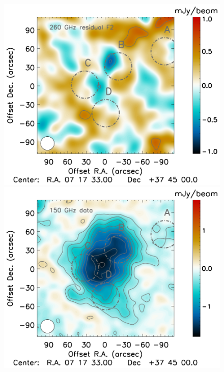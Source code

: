 \documentclass[twocolumn,traditabstract]{aa}
\begin{document}
\begin{figure}[h]
\includegraphics[trim=2.3cm 0.7cm 0cm 0cm, clip=true, totalheight=4cm]{Figure/MCMC_residual_1mm_ksz2_F2.pdf}
\includegraphics[trim=0cm 0.7cm 3.33cm 0cm, clip=true, totalheight=4cm]{Figure/MCMC_data_2mm_ksz2.pdf}

\end{figure}
\end{document}
